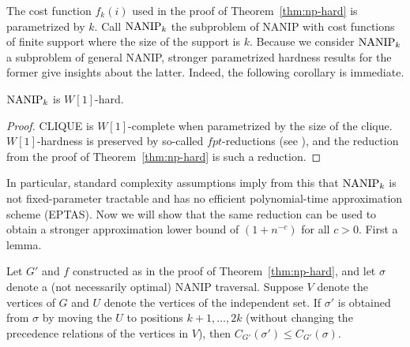 The cost function $f_k(i)$ used in the proof of Theorem~\ref{thm:np-hard} is
parametrized by $k$.  Call $\textup{NANIP}_k$ the subproblem of NANIP with cost
functions of finite support where the size of the support is $k$. Because we
consider $\textup{NANIP}_k$ a subproblem of general NANIP, stronger
parametrized hardness results for the former give insights about the latter.
Indeed, the following corollary is immediate.

\begin{corollary}
$\textup{NANIP}_k$ is $W[1]$-hard.
\end{corollary}

\begin{proof} 

CLIQUE is $W[1]$-complete when parametrized by the size of the clique.
$W[1]$-hardness is preserved by so-called $fpt$-reductions (see
\cite{DowneyF13}), and the reduction from the proof of
Theorem~\ref{thm:np-hard} is such a reduction. 

\end{proof}

In particular, standard complexity assumptions imply from this that
$\textup{NANIP}_k$ is not fixed-parameter tractable and has no efficient
polynomial-time approximation scheme (EPTAS). Now we will show that the same
reduction can be used to obtain a stronger approximation lower bound of $(1 +
n^{-c})$ for all $c > 0$. First a lemma.

\begin{lemma}
Let $G'$ and $f$ constructed as in the proof of Theorem~\ref{thm:np-hard}, and
let $\sigma$ denote a (not necessarily optimal) NANIP traversal.  Suppose $V$
denote the vertices of $G$ and $U$ denote the vertices of the independent set.
If $\sigma'$ is obtained from $\sigma$ by moving the $U$ to positions
$k+1,\ldots,2k$ (without changing the precedence relations of the vertices in
$V$), then $C_{G'}(\sigma')\le C_{G'}(\sigma)$.
\end{lemma}


